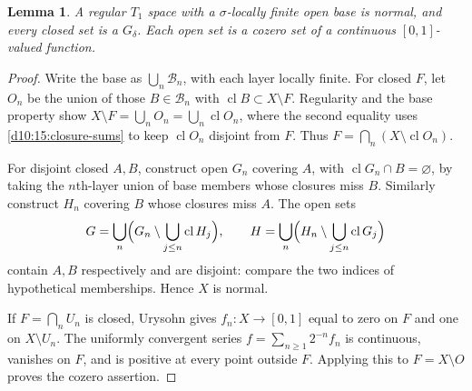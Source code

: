 \documentclass[11pt,oneside,openany]{book}
\newtheorem{lemma}[theorem]{Lemma}
\theoremstyle{definition}
\theoremstyle{remark}
\DeclareMathOperator{\cl}{cl}
\begin{document}
\begin{lemma}\label{d10:15:perfect-normal}
A regular $T_1$ space with a $\sigma$-locally finite open base is normal,
and every closed set is a $G_\delta$. Each open set is a cozero set of
a continuous $[0,1]$-valued function.
\end{lemma}
\begin{proof}
Write the base as $\bigcup_n\mathcal B_n$, with each layer locally finite.
For closed $F$, let $O_n$ be the union of those $B\in\mathcal B_n$
with $\cl B\subset X\setminus F$. Regularity and the base property show
$X\setminus F=\bigcup_n O_n=\bigcup_n\cl O_n$, where the second equality
uses \cref{d10:15:closure-sums} to keep $\cl O_n$ disjoint from $F$.
Thus $F=\bigcap_n(X\setminus\cl O_n)$.

For disjoint closed $A,B$, construct open $G_n$ covering $A$, with
$\cl G_n\cap B=\varnothing$, by taking the $n$th-layer union of base
members whose closures miss $B$. Similarly construct $H_n$ covering $B$
whose closures miss $A$. The open sets
\[
 G=\bigcup_n\Bigl(G_n\setminus\bigcup_{j\leq n}\cl H_j\Bigr),\qquad
 H=\bigcup_n\Bigl(H_n\setminus\bigcup_{j\leq n}\cl G_j\Bigr)
\]
contain $A,B$ respectively and are disjoint: compare the two indices
of hypothetical memberships. Hence $X$ is normal.

If $F=\bigcap_n U_n$ is closed, Urysohn gives $f_n:X\to[0,1]$
equal to zero on $F$ and one on $X\setminus U_n$.
The uniformly convergent series $f=\sum_{n\geq1}2^{-n}f_n$ is continuous,
vanishes on $F$, and is positive at every point outside $F$.
Applying this to $F=X\setminus O$ proves the cozero assertion.
\end{proof}
\end{document}
